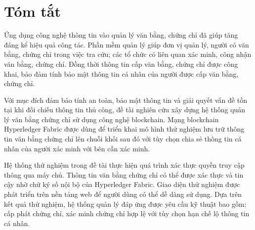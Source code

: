 \chapter*{Tóm tắt}
Ứng dụng công nghệ thông tin vào quản lý văn bằng, chứng chỉ đã giúp tăng đáng kể hiệu quả công tác. Phần mềm quản lý giúp đơn vị quản lý, người có văn bằng, chứng chỉ trong việc tra cứu; các tổ chức có liên quan xác minh, công nhận văn bằng, chứng chỉ. Đồng thời thông tin cấp văn bằng, chứng chỉ được công khai, bảo đảm tính bảo mật thông tin cá nhân của người được cấp văn bằng, chứng chỉ. 

Với mục đích đảm bảo tính an toàn, bảo mật thông tin và giải quyết vấn đề tồn tại khi đối chiếu thông tin thủ công, đề tài nghiên cứu xây dựng hệ thống quản lý văn bằng chứng chỉ sử dụng công nghệ blockchain. Mạng blockchain Hyperledger Fabric được dùng để triển khai mô hình thử nghiệm lưu trữ thông tin văn bằng chứng chỉ lên chuỗi khối sau đó với tùy chọn chia sẻ thông tin cá nhân của người xác minh với bên cần xác minh.

Hệ thống thử nghiệm trong đề tài thực hiện quá trình xác thực quyền truy cập thông qua máy chủ. Thông tin văn bằng chứng chỉ có thể được xác thực và tin cậy nhờ chữ ký số nội bộ của Hyperledger Fabric. Giao diện thử nghiệm được phát triển trên nền tảng web để người dùng có thể dễ dàng sử dụng. Dựa trên kết quả thử nghiệm, hệ thống quản lý đáp ứng được yêu cầu kỹ thuật bao gồm: cấp phát chứng chỉ, xác minh chứng chỉ hợp lệ với tùy chọn hạn chế lộ thông tin cá nhân.
